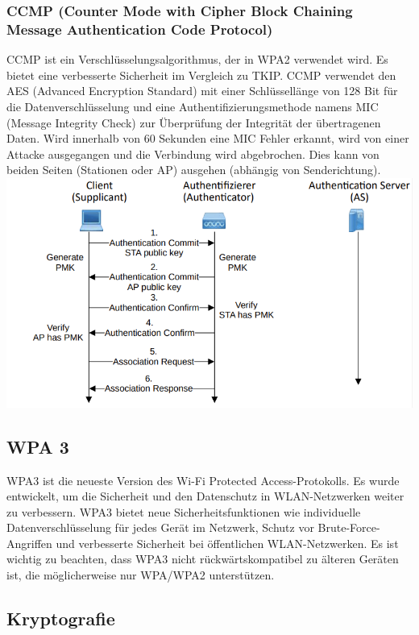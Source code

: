 \documentclass[12pt,a4paper]{article}
\begin{document}
		\subsubsection{CCMP (Counter Mode with Cipher Block Chaining Message Authentication Code Protocol)}
			CCMP ist ein Verschlüsselungsalgorithmus, der in WPA2 verwendet wird. Es bietet eine verbesserte Sicherheit im Vergleich zu TKIP. CCMP verwendet den AES (Advanced Encryption Standard) mit einer Schlüssellänge von 128 Bit für die Datenverschlüsselung und eine Authentifizierungsmethode namens MIC (Message Integrity Check) zur Überprüfung der Integrität der übertragenen Daten. Wird innerhalb von 60 Sekunden eine MIC Fehler erkannt, wird von einer Attacke ausgegangen und die Verbindung wird abgebrochen. Dies kann von beiden Seiten (Stationen oder AP) ausgehen (abhängig von Senderichtung).\\
			\includegraphics[width=\textwidth]{Bilder/wpa3.PNG}

	\subsection{WPA 3}
		WPA3 ist die neueste Version des Wi-Fi Protected Access-Protokolls. Es wurde entwickelt, um die Sicherheit und den Datenschutz in WLAN-Netzwerken weiter zu verbessern. WPA3 bietet neue Sicherheitsfunktionen wie individuelle Datenverschlüsselung für jedes Gerät im Netzwerk, Schutz vor Brute-Force-Angriffen und verbesserte Sicherheit bei öffentlichen WLAN-Netzwerken. Es ist wichtig zu beachten, dass WPA3 nicht rückwärtskompatibel zu älteren Geräten ist, die möglicherweise nur WPA/WPA2 unterstützen.

	\subsection{Kryptografie}
\end{document}
